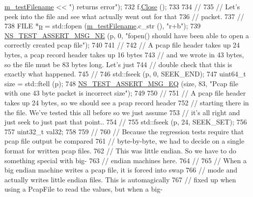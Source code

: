 \begin{DoxyCode}
      \hyperlink{classRecordHeaderTestCase_a120cda070e5262333c795ce77359528e}{m\_testFilename} << \textcolor{stringliteral}{") returns error"});
732   f.\hyperlink{classns3_1_1PcapFile_ad3b6c28d464742ee1fa3a64628339a5b}{Close} ();
733 
734   \textcolor{comment}{//}
735   \textcolor{comment}{// Let's peek into the file and see what actually went out for that}
736   \textcolor{comment}{// packet.}
737   \textcolor{comment}{//}
738   FILE *\hyperlink{lte__link__budget_8m_ac9de518908a968428863f829398a4e62}{p} = std::fopen (\hyperlink{classRecordHeaderTestCase_a120cda070e5262333c795ce77359528e}{m\_testFilename}.c\_str (), \textcolor{stringliteral}{"r+b"});
739   \hyperlink{group__testing_ga73d66fb0050a5111453fd144e767b91a}{NS\_TEST\_ASSERT\_MSG\_NE} (p, 0, \textcolor{stringliteral}{"fopen() should have been able to open a correctly
       created pcap file"});
740 
741   \textcolor{comment}{//}
742   \textcolor{comment}{// A pcap file header takes up 24 bytes, a pcap record header takes up 16 bytes}
743   \textcolor{comment}{// and we wrote in 43 bytes, so the file must be 83 bytes long.  Let's just}
744   \textcolor{comment}{// double check that this is exactly what happened.}
745   \textcolor{comment}{//}
746   std::fseek (p, 0, SEEK\_END);
747   uint64\_t size = std::ftell (p);
748   \hyperlink{group__testing_ga2a9d78cffb3db8e867c35fff0b698cf5}{NS\_TEST\_ASSERT\_MSG\_EQ} (size, 83, \textcolor{stringliteral}{"Pcap file with one 43 byte packet is incorrect
       size"});
749 
750   \textcolor{comment}{//}
751   \textcolor{comment}{// A pcap file header takes up 24 bytes, so we should see a pcap record header}
752   \textcolor{comment}{// starting there in the file.  We've tested this all before so we just assume}
753   \textcolor{comment}{// it's all right and just seek to just past that point..}
754   \textcolor{comment}{//}
755   std::fseek (p, 24, SEEK\_SET);
756 
757   uint32\_t val32;
758 
759   \textcolor{comment}{//}
760   \textcolor{comment}{// Because the regression tests require that pcap file output be compared }
761   \textcolor{comment}{// byte-by-byte, we had to decide on a single format for written pcap files.}
762   \textcolor{comment}{// This was little endian.  So we have to do something special with big-}
763   \textcolor{comment}{// endian machines here.}
764   \textcolor{comment}{//}
765   \textcolor{comment}{// When a big endian machine writes a pcap file, it is forced into swap}
766   \textcolor{comment}{// mode and actually writes little endian files.  This is automagically}
767   \textcolor{comment}{// fixed up when using a PcapFile to read the values, but when a big-}

\end{DoxyCode}
